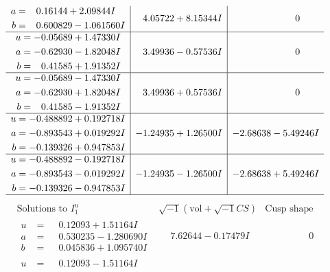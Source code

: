 \documentclass[1p]{elsarticle_modified}
\theoremstyle{definition}
\newcommand{\I}{\sqrt{-1}}
\begin{document}
$$\begin{array}{c|c|c}
\begin{aligned}
a &= \phantom{-}0.16144 + 2.09844 I \\
b &= \phantom{-}0.600829 - 1.061560 I\end{aligned}
 & \phantom{-}4.05722 + 8.15344 I & \phantom{-0.000000 } 0 \\ \hline\begin{aligned}
u &= -0.05689 + 1.47330 I \\
a &= -0.62930 - 1.82048 I \\
b &= \phantom{-}0.41585 + 1.91352 I\end{aligned}
 & \phantom{-}3.49936 - 0.57536 I & \phantom{-0.000000 } 0 \\ \hline\begin{aligned}
u &= -0.05689 - 1.47330 I \\
a &= -0.62930 + 1.82048 I \\
b &= \phantom{-}0.41585 - 1.91352 I\end{aligned}
 & \phantom{-}3.49936 + 0.57536 I & \phantom{-0.000000 } 0 \\ \hline\begin{aligned}
u &= -0.488892 + 0.192718 I \\
a &= -0.893543 + 0.019292 I \\
b &= -0.139326 + 0.947853 I\end{aligned}
 & -1.24935 + 1.26500 I & -2.68638 - 5.49246 I \\ \hline\begin{aligned}
u &= -0.488892 - 0.192718 I \\
a &= -0.893543 - 0.019292 I \\
b &= -0.139326 - 0.947853 I\end{aligned}
 & -1.24935 - 1.26500 I & -2.68638 + 5.49246 I\\
 \hline 
 \end{array}$$\newpage$$\begin{array}{c|c|c}  
\text{Solutions to }I^u_{1}& \I (\text{vol} + \sqrt{-1}CS) & \text{Cusp shape}\\
 \hline 
\begin{aligned}
u &= \phantom{-}0.12093 + 1.51164 I \\
a &= \phantom{-}0.530235 - 1.280690 I \\
b &= \phantom{-}0.045836 + 1.095740 I\end{aligned}
 & \phantom{-}7.62644 - 0.17479 I & \phantom{-0.000000 } 0 \\ \hline\begin{aligned}
u &= \phantom{-}0.12093 - 1.51164 I \\

\end{aligned}
\end{array}$$
\end{document}
